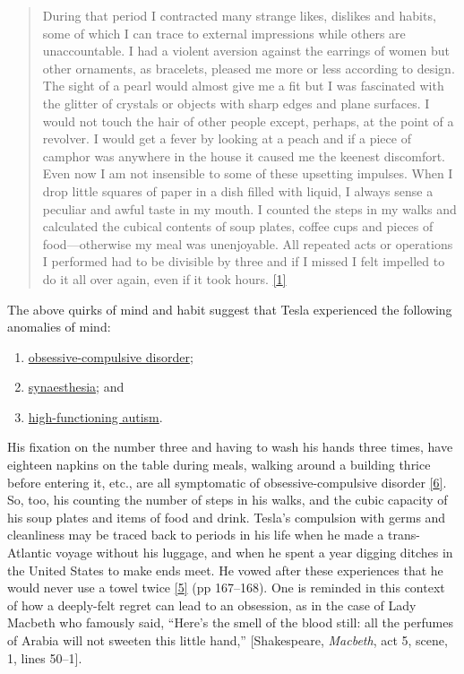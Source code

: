 \documentclass[
  12pt,
  british,
  a4paper,
  rgb,
  dvipsnames,
  svgnames,
  hyphens]{article}
\providecommand{\tightlist}{%
  \setlength{\itemsep}{0pt}\setlength{\parskip}{0pt}}
\begin{document}
\begin{quote}
During that period I contracted many strange likes, dislikes and habits,
some of which I can trace to external impressions while others are
unaccountable. I had a violent aversion against the earrings of women
but other ornaments, as bracelets, pleased me more or less according to
design. The sight of a pearl would almost give me a fit but I was
fascinated with the glitter of crystals or objects with sharp edges and
plane surfaces. I would not touch the hair of other people except,
perhaps, at the point of a revolver. I would get a fever by looking at a
peach and if a piece of camphor was anywhere in the house it caused me
the keenest discomfort. Even now I am not insensible to some of these
upsetting impulses. When I drop little squares of paper in a dish filled
with liquid, I always sense a peculiar and awful taste in my mouth. I
counted the steps in my walks and calculated the cubical contents of
soup plates, coffee cups and pieces of food---otherwise my meal was
unenjoyable. All repeated acts or operations I performed had to be
divisible by three and if I missed I felt impelled to do it all over
again, even if it took hours. \protect\hyperlink{ref-john83}{{[}1{]}}
\end{quote}

The above quirks of mind and habit suggest that Tesla experienced the
following anomalies of mind:

\begin{enumerate}
\tightlist
\item
  \href{https://en.wikipedia.org/wiki/Obsessive\%E2\%80\%93compulsive_disorder}{obsessive-compulsive
  disorder};
\item
  \href{https://en.wikipedia.org/wiki/Synesthesia}{synaesthesia}; and
\item
  \href{https://en.wikipedia.org/wiki/High-functioning_autism}{high-functioning
  autism}.
\end{enumerate}

His fixation on the number three and having to wash his hands three
times, have eighteen napkins on the table during meals, walking around a
building thrice before entering it, etc., are all symptomatic of
obsessive-compulsive disorder
\protect\hyperlink{ref-tesla-wiki}{{[}6{]}}. So, too, his counting the
number of steps in his walks, and the cubic capacity of his soup plates
and items of food and drink. Tesla's compulsion with germs and
cleanliness may be traced back to periods in his life when he made a
trans-Atlantic voyage without his luggage, and when he spent a year
digging ditches in the United States to make ends meet. He vowed after
these experiences that he would never use a towel twice
\protect\hyperlink{ref-lomas99}{{[}5{]}} (pp 167--168). One is reminded
in this context of how a deeply-felt regret can lead to an obsession, as
in the case of Lady Macbeth who famously said, ``Here's the smell of the
blood still: all the perfumes of Arabia will not sweeten this little
hand,'' {[}Shakespeare, \emph{Macbeth}, act 5, scene, 1, lines 50--1{]}.
\end{document}
